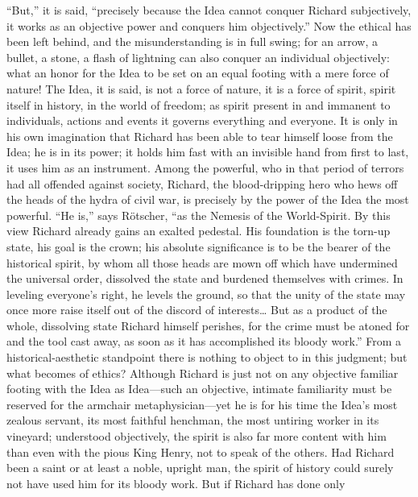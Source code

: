 \documentclass[12pt,a4paper,openany]{book}
\newcommand{\opage}[1]{\marginnote{\footnotesize\textit{[#1]}}}
\begin{document}
``But,'' it is said, ``precisely because the Idea cannot conquer
Richard subjectively, it works as an objective power and
conquers him objectively.'' Now the ethical has been left behind,
and the misunderstanding is in full swing; for an arrow, a bullet,
a stone, a flash of lightning can also conquer an individual
\setcounter{footnote}{0}%
\opage{548}objectively: what an honor for the Idea to be set on an equal
footing with a mere force of nature! The Idea, it is said, is
not a force of nature, it is a force of spirit, spirit itself in history,
in the world of freedom; as spirit present in and immanent to individuals,
actions and events it governs
everything and everyone. It is only in his own imagination that
Richard has been able to tear himself loose from the Idea; he is in its
power; it holds him fast with an invisible hand from first
to last, it uses him as an instrument. Among the
powerful, who in that period of terrors had all offended
against society, Richard, the blood-dripping
hero who hews off the heads of the hydra of civil war,
is precisely by the power of the Idea the most powerful. ``He is,'' says
Rötscher, ``as the Nemesis of the World-Spirit. By this view
Richard already gains an exalted pedestal.
His foundation is the torn-up state, his goal is the crown;
his absolute significance is to be the bearer of
the historical spirit, by whom all those heads are mown off
which have undermined the universal order, dissolved the state and
burdened themselves with crimes. In leveling everyone's
right, he levels the ground, so that the unity of the state may once more
raise itself out of the discord of interests\dots{} But
as a product of the whole, dissolving state Richard
himself perishes, for the crime must be atoned for and
the tool cast away, as soon as it has accomplished its
bloody work.'' From a historical-aesthetic standpoint
there is nothing to object to in this judgment; but
what becomes of ethics? Although Richard
is just not on any objective familiar footing with
the Idea as Idea---such an objective, intimate familiarity
must be reserved for the armchair metaphysician---yet he is
\setcounter{footnote}{0}%
\opage{549}for his time the Idea's most zealous servant, its most faithful
henchman, the most untiring worker in its vineyard;
understood objectively, the spirit is also far
more content with him than even with the pious King
Henry, not to speak of the others. Had Richard
been a saint or at least a noble, upright man,
the spirit of history could surely not have used him
for its bloody work. But if Richard has done only
\end{document}
